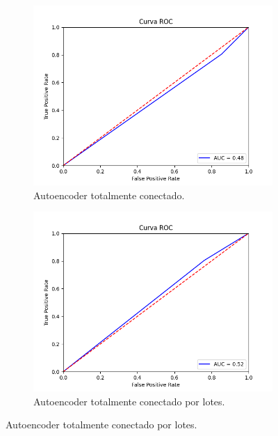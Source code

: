\begin{figure}[H]
	\centering
	\begin{subfigure}{.49\textwidth}
		\centering
		\includegraphics[scale=0.42]{imagenes/roc/Autoencoder-Fully-Connected_roc.png}
		\caption{Autoencoder totalmente conectado.}
	\end{subfigure}
	\begin{subfigure}{.49\textwidth}
		\centering
		\includegraphics[scale=0.42]{imagenes/roc/Autoencoder-Fully-Connected-Lotes_roc.png}
		\caption{Autoencoder totalmente conectado por lotes.}
	\end{subfigure}
	\label{img:roc1}
\end{figure}

